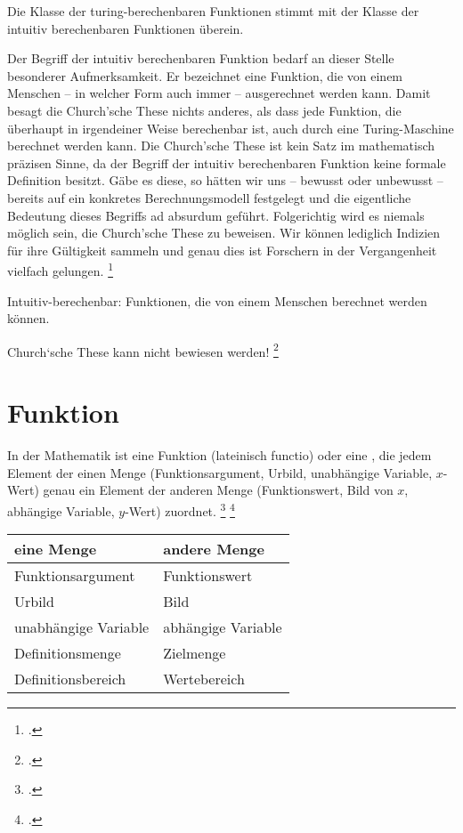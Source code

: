 \documentclass{bschlangaul-theorie}
\begin{document}
Die Klasse der turing-berechenbaren Funktionen stimmt mit der
Klasse der intuitiv berechenbaren Funktionen überein.

Der Begriff der intuitiv berechenbaren Funktion bedarf an dieser Stelle
besonderer Aufmerksamkeit. Er bezeichnet eine Funktion, die von einem
Menschen – in welcher Form auch immer – ausgerechnet werden kann. Damit
besagt die Church’sche These nichts anderes, als dass jede Funktion,
die überhaupt in irgendeiner Weise berechenbar ist, auch durch eine
Turing-Maschine berechnet werden kann. Die Church’sche These ist kein
Satz im mathematisch präzisen Sinne, da der Begriff der intuitiv
berechenbaren Funktion keine formale Definition besitzt. Gäbe es
diese, so hätten wir uns – bewusst oder unbewusst – bereits auf ein
konkretes Berechnungsmodell festgelegt und die eigentliche Bedeutung
dieses Begriffs ad absurdum geführt. Folgerichtig wird es niemals
möglich sein, die Church’sche These zu beweisen. Wir können lediglich
Indizien für ihre Gültigkeit sammeln und genau dies ist Forschern in der
Vergangenheit vielfach gelungen.
\footcite[Seite 308]{hoffmann}

Intuitiv-berechenbar:
Funktionen, die von einem Menschen berechnet werden können.

Church‘sche These kann nicht bewiesen werden!
\footcite[Seite 27]{theo:fs:4}

\section{Funktion}

In der Mathematik ist eine Funktion (lateinisch functio) oder
 eine , die jedem Element der einen Menge (Funktionsargument, Urbild,
unabhängige Variable, $x$-Wert) genau ein Element der anderen Menge
(Funktionswert, Bild von $x$, abhängige Variable, $y$-Wert) zuordnet.
\footcite[Seite 51]{hoffmann}
\footcite{wiki:funktion}

\begin{center}
\begin{tabular}{l|l}
eine Menge & andere Menge\\\hline
Funktionsargument & Funktionswert\\
Urbild & Bild\\
unabhängige Variable & abhängige Variable\\
Definitionsmenge & Zielmenge\\
Definitionsbereich & Wertebereich\\
\end{tabular}
\end{center}
\end{document}
